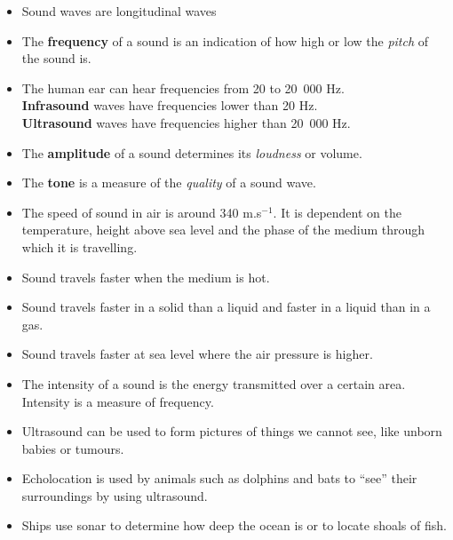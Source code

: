 \pagebreak
{}
\begin{itemize}
\item Sound waves are longitudinal waves
\item The \textbf{frequency} of a sound is an indication of how high or low the \emph{pitch} of the sound is.
\item The human ear can hear frequencies from 20 to 20~000 Hz. \\
\textbf{Infrasound} waves have frequencies lower than 20 Hz. \\
\textbf{Ultrasound} waves have frequencies higher than 20~000 Hz.
\item The \textbf{amplitude} of a sound determines its \emph{loudness} or volume.
\item The \textbf{tone} is a measure of the \emph{quality} of a sound wave.
\item The speed of sound in air is around 340 m.s$^{-1}$. It is dependent on the temperature, height above sea level and the phase of the medium through which it is travelling.
\item Sound travels faster when the medium is hot.
\item Sound travels faster in a solid than a liquid and faster in a liquid than in a gas.
\item Sound travels faster at sea level where the air pressure is higher.
\item The intensity of a sound is the energy transmitted over a certain area. Intensity is a measure of frequency.
\item Ultrasound can be used to form pictures of things we cannot see, like unborn babies or tumours.
\item Echolocation is used by animals such as dolphins and bats to ``see'' their surroundings by using ultrasound.
\item Ships use sonar to determine how deep the ocean is or to locate shoals of fish.
\end{itemize}

